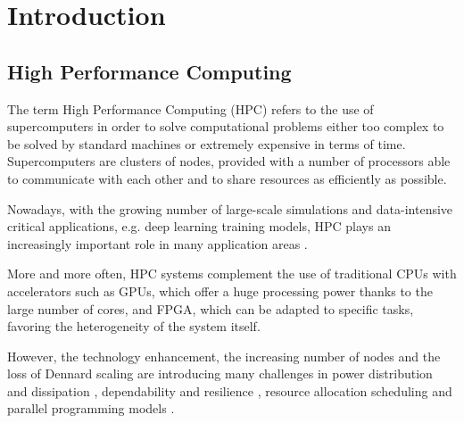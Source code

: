%
%

\cleardoublepage
%
%
%
\chapter{Introduction}
%
%
\label{cap:introduction}

\section{High Performance Computing}
The term High Performance Computing (HPC) refers to the use of supercomputers in order to solve computational problems either too complex to be solved by standard machines or extremely expensive in terms of time. Supercomputers are clusters of nodes, provided with a number of processors able to communicate with each other and to share resources as efficiently as possible.

Nowadays, with the growing number of large-scale simulations and data-intensive critical applications, e.g. deep learning training models, HPC plays an increasingly important role in many application areas \cite{marqube_2020}.

More and more often, HPC systems complement the use of traditional CPUs with accelerators such as GPUs, which offer a huge processing power thanks to the large number of cores, and FPGA, which can be adapted to specific tasks, favoring the heterogeneity of the system itself.

However, the technology enhancement, the increasing number of nodes and the loss of Dennard scaling \cite{10.1145/2024723.2000108} are introducing many challenges in power distribution and dissipation \cite{article}, dependability and resilience \cite{inproceedings}, resource allocation scheduling \cite{4629245} and parallel programming models \cite{Shalf2010ExascaleCT}.

